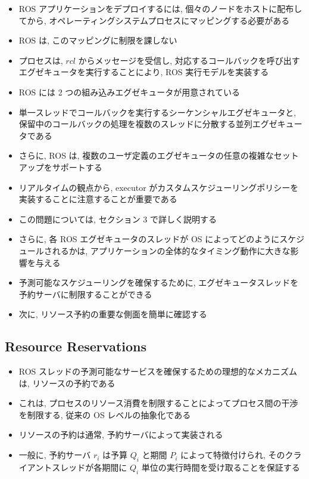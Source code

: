 \begin{frame}{}
    \begin{itemize}
        \item ROS アプリケーションをデプロイするには, 個々のノードをホストに配布してから, オペレーティングシステムプロセスにマッピングする必要がある
        \item ROS は, このマッピングに制限を課しない
        \item プロセスは, $r c l$ からメッセージを受信し, 対応するコールバックを呼び出すエグゼキュータを実行することにより, ROS 実行モデルを実装する
        \item ROS には 2 つの組み込みエグゼキュータが用意されている
        \item 単一スレッドでコールバックを実行するシーケンシャルエグゼキュータと, 保留中のコールバックの処理を複数のスレッドに分散する並列エグゼキュータである
        \item さらに, ROS は, 複数のユーザ定義のエグゼキュータの任意の複雑なセットアップをサポートする
    \end{itemize}
\end{frame}

\begin{frame}{}
    \begin{itemize}
        \item リアルタイムの観点から, executor がカスタムスケジューリングポリシーを実装することに注意することが重要である
        \item この問題については, セクション 3 で詳しく説明する
        \item さらに, 各 ROS エグゼキュータのスレッドが OS によってどのようにスケジュールされるかは, アプリケーションの全体的なタイミング動作に大きな影響を与える
        \item 予測可能なスケジューリングを確保するために, エグゼキュータスレッドを予約サーバに制限することができる
        \item 次に, リソース予約の重要な側面を簡単に確認する
    \end{itemize}
\end{frame}


\subsection{Resource Reservations}
\label{ssec: resource reservations}

\begin{frame}{}
    \begin{itemize}
        \item ROS スレッドの予測可能なサービスを確保するための理想的なメカニズムは, リソースの予約である
        \item これは, プロセスのリソース消費を制限することによってプロセス間の干渉を制限する, 従来の OS レベルの抽象化である
        \item リソースの予約は通常, 予約サーバによって実装される
        \item 一般に, 予約サーバ $r_{i}$ は予算 $Q_{i}$ と期間 $P_{i}$ によって特徴付けられ, そのクライアントスレッドが各期間に $Q_{i}$ 単位の実行時間を受け取ることを保証する
    \end{itemize}
\end{frame}

